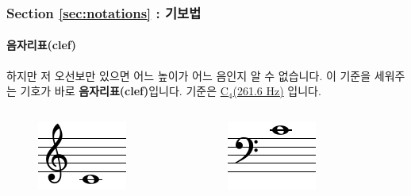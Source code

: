 \documentclass{beamer}
\begin{document}
	\begin{frame}
		\frametitle{Section \ref{sec:notations} : 기보법}
		\framesubtitle{음자리표(clef)}
		하지만 저 오선보만 있으면 어느 높이가 어느 음인지 알 수 없습니다. 이 기준을 세워주는 기호가 바로 {\bf 음자리표(clef)}입니다. 기준은 {\color{cyan} \href{run:res/mp3/4/clef/C4.mp3}{C$_4$(261.6 Hz)}} 입니다.
		\begin{columns}
			\begin{column}{0.3\textwidth}
				\centering
				\noindent
				\begin{figure}[h!]
					\includegraphics[width=0.7\columnwidth]{res/pdf/4/clef/g_clef.pdf}
				\end{figure}
			\end{column}
			\begin{column}{0.3\textwidth}
				\centering
				\noindent
				\begin{figure}[h!]
					\includegraphics[width=0.7\columnwidth, trim=0 0 0 0.3pc]{res/pdf/4/clef/f_clef.pdf}
				\end{figure}
			\end{column}
			\begin{column}{0.3\textwidth}

\end{column}
\end{columns}
\end{frame}
\end{document}
